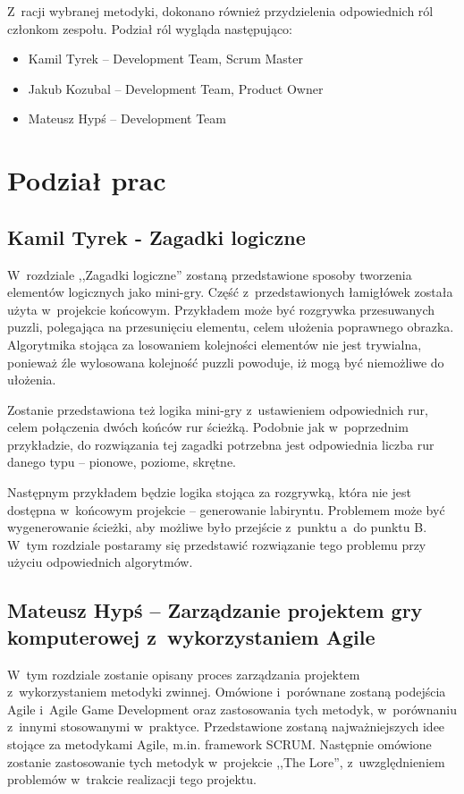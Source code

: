 \documentclass[oneside,polski,logo]{amuthesis}
\begin{document}
Z~racji wybranej metodyki, dokonano również przydzielenia odpowiednich ról członkom zespołu. Podział ról wygląda następująco:

\begin{itemize}
	\item Kamil Tyrek –  Development Team, Scrum Master
	\item Jakub Kozubal –  Development Team, Product Owner
	\item Mateusz Hypś –  Development Team
\end{itemize}

\section{Podział prac}
\subsection{Kamil Tyrek - Zagadki logiczne}
W~rozdziale ,,Zagadki logiczne'' zostaną przedstawione sposoby tworzenia elementów logicznych jako mini-gry. Część z~przedstawionych łamigłówek została użyta w~projekcie końcowym. Przykładem może być rozgrywka przesuwanych puzzli, polegająca na przesunięciu elementu, celem ułożenia poprawnego obrazka. Algorytmika stojąca za losowaniem kolejności elementów nie jest trywialna, ponieważ źle wylosowana kolejność puzzli powoduje, iż mogą być niemożliwe do ułożenia.

Zostanie przedstawiona też logika mini-gry z~ustawieniem odpowiednich rur, celem połączenia dwóch końców rur ścieżką. Podobnie jak w~poprzednim przykładzie, do rozwiązania tej zagadki potrzebna jest odpowiednia liczba rur danego typu – pionowe, poziome, skrętne. 

Następnym przykładem będzie logika stojąca za rozgrywką, która nie jest dostępna w~końcowym projekcie – generowanie labiryntu. Problemem może być wygenerowanie ścieżki, aby możliwe było przejście z~punktu a~do punktu B. W~tym rozdziale postaramy się przedstawić rozwiązanie tego problemu przy użyciu odpowiednich algorytmów.

\subsection{Mateusz Hypś – Zarządzanie projektem gry komputerowej z~wykorzystaniem Agile}
\hfill \break
W~tym rozdziale zostanie opisany proces zarządzania projektem z~wykorzystaniem metodyki zwinnej. Omówione i~porównane zostaną podejścia Agile i~Agile Game Development oraz zastosowania tych metodyk, w~porównaniu z~innymi stosowanymi w~praktyce. Przedstawione zostaną najważniejszych idee stojące za metodykami Agile, m.in. framework SCRUM. Następnie omówione zostanie zastosowanie tych metodyk w~projekcie ,,The Lore”, z~uwzględnieniem problemów w~trakcie realizacji tego projektu. 
\end{document}
